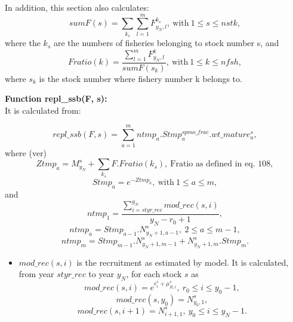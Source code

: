 \documentclass{article}
\begin{document}
In addition, this section also calculates:
\begin{equation}
    sumF(s)=\sum_{k_s}\sum_{l=1}^m F^{k_s}_{y_N,l}, \  \text{with} \ 1\leq s \leq nstk,
\end{equation}
where the $k_s$ are the numbers of fisheries belonging to stock number s, and
\begin{equation}
    Fratio(k)=\dfrac{\sum_{l=1}^mF^k_{y_N,l}}{sumF(s_k)}, \  \text{with} \ 1\leq k  \leq nfsh,
\end{equation}
where $s_k$ is the stock number where fishery number k belongs to.

\textbf{Function repl\_ssb(F, s):}\\
It is calculated from:

\begin{equation}
    repl\_ssb(F,s)=\sum_{a=1}^m ntmp_a. Stmp^{spmo\_frac}_a.wt\_mature^s_a,
\end{equation}
where (ver)
\begin{equation}
    Ztmp_a=M^s_{y_N}+\sum_{k_s}F.Fratio(k_s), \ \text{Fratio as defined in eq. 108},
\end{equation}
\begin{equation}
    Stmp_a=e^{-Ztmp_a}, \ \text{with} \ 1\leq a \leq m,
\end{equation}
and
\begin{equation}
    ntmp_1 = \dfrac{\displaystyle\sum_{i=styr\_rec}^{y_N} {mod\_rec}(s,i)}{{y_N}-r_0+1},
\end{equation}
\begin{equation}
    ntmp_a=Stmp_{a-1}.N^s_{y_N+1,{a-1}}, \ 2\leq a\leq m-1,
\end{equation}
\begin{equation}
    ntmp_{m}=Stmp_{m-1}.N^s_{y_N+1,m-1}+N^s_{y_N+1,m}.Stmp_{m}.
\end{equation}
\begin{itemize}
    \item $mod\_rec(s,i)$ is the recruitment as estimated by model. It is calculated, from year $styr\_rec$ to year $y_N$, for each stock $s$ as
     \begin{equation}
        mod\_rec(s,i)=e^{\epsilon^s_i+\mu^s_{R,i}}, \ r_0\leq i \leq y_0-1,
    \end{equation}
    \begin{equation}
        mod\_rec(s,y_0)=N^s_{y_0,1},
    \end{equation}
    \begin{equation}
        mod\_rec(s,i+1)=N^s_{i+1,1}, \ y_0\leq i \leq y_N-1.
    \end{equation}
   
\end{itemize}
\end{document}
